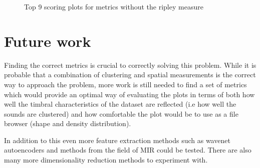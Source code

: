 \documentclass[a4paper, 12pt, twoside]{report}
\begin{document}
\begin{figure}[h!tbp]
\centering
{}
\caption{Top 9 scoring plots for metrics without the ripley measure}
\label{fig:top9_no_pca3}
\end{figure}


\section{Future work}
\label{sec:org1054556}

Finding the correct metrics is crucial to correctly solving this problem. While it is probable that a combination of clustering and spatial measurements is the correct way to approach the problem, more work is still needed to find a set of metrics which would provide an optimal way of evaluating the plots in terms of both how well the timbral characteristics of the dataset are reflected (i.e how well the sounds are clustered) and how comfortable the plot would be to use as a file browser (shape and density distribution).

In addition to this even more feature extraction methods such as wavenet autoencoders and methods from the field of MIR could be tested. There are also many more dimensionality reduction methods to experiment with.
\end{document}
